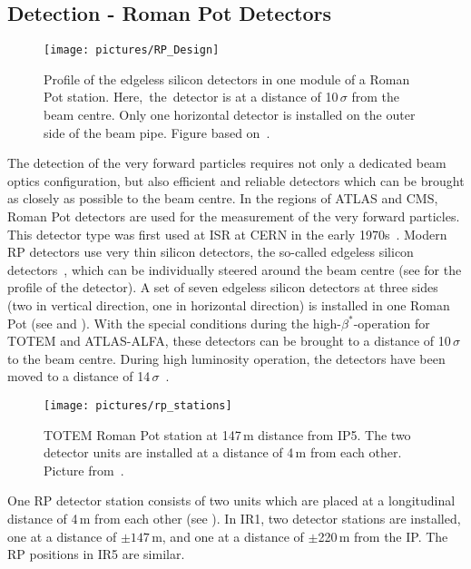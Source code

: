 \subsection{Detection - Roman Pot Detectors}
\begin{figure}[b]
  \centering
  \texttt{[image: pictures/RP\_Design]}
  \caption{Profile of the edgeless silicon detectors in one module of a Roman Pot station. \mbox{Here, the detector} is at a distance of 10$\,\sigma$ from the beam centre. Only one horizontal detector is installed on the outer side of the beam pipe. Figure based on~\cite{LHCAcceleratorExperiments}.} 
   \label{rpdesign}
\end{figure}
%
The detection of the very forward particles requires not only a dedicated beam optics \mbox{configuration}, but also efficient and reliable detectors which can be brought as closely as possible to the beam centre.  In the regions of ATLAS and CMS, Roman Pot detectors are used for the measurement of the very forward particles. This detector type was first used at ISR at CERN in the early 1970s~\cite{rps}. Modern RP detectors use very thin silicon detectors, the so-called edgeless silicon detectors~\cite{LHCAcceleratorExperiments}, which can be individually steered around the beam centre (see  for the profile of the detector). A set of seven edgeless silicon detectors at three sides (two in vertical direction, one in horizontal direction) is installed in one Roman Pot (see  and ). With the special conditions during the \mbox{high-$\beta^*$-operation} for TOTEM and ATLAS-ALFA, these detectors can be brought to a distance of 10$\,\sigma$ to the beam centre. During high luminosity operation, the detectors have been moved to a distance of 14$\,\sigma$~\cite{Deile_Private}. 
\begin{figure}[t]
  \centering
  \texttt{[image: pictures/rp\_stations]}
  \caption{TOTEM Roman Pot station at 147$\,$m distance from IP5. The two detector units are installed at a distance of 4$\,$m from each other. Picture from~\cite{CERN-THESIS-2010-135}.} 
   \label{rpstations}
\end{figure}
\newpage
One RP detector station consists of two units which are placed at a longitudinal distance of 4$\,$m from each other (see ). In IR1, two detector stations are installed, one at a distance of $\pm 147\,$m, and one at a distance of $\pm$220$\,$m from the IP. The RP positions in IR5 are similar. 

